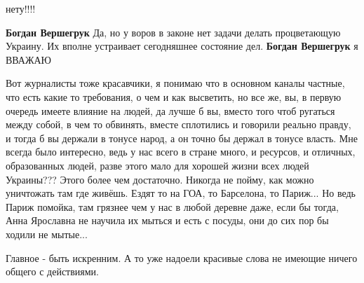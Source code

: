 \begin{itemize}
нету!!!!
\begin{itemize}
\textbf{Богдан Вершегрук} Да, но у воров в законе нет задачи делать процветающую Украину. Их вполне устраивает сегодняшнее состояние дел.
\textbf{Богдан Вершегрук} я ВВАЖАЮ
\end{itemize}

Вот журналисты тоже красавчики, я понимаю что в основном каналы частные, что
есть какие то требования, о чем и как высветить, но все же, вы, в первую
очередь имеете влияние на людей, да лучше б вы, вместо того чтоб ругаться между
собой, в чем то обвинять, вместе сплотились и говорили реально правду, и тогда
б вы держали в тонусе народ, а он точно бы держал в тонусе власть. Мне всегда
было интересно, ведь у нас всего в стране много, и ресурсов, и отличных,
образованных людей, разве этого мало для хорошей жизни всех людей Украины???
Этого более чем достаточно. Никогда не пойму, как можно уничтожать там где
живёшь. Ездят то на ГОА, то Барселона, то Париж... Но ведь Париж помойка, там
грязнее чем у нас в любой деревне даже, если бы тогда, Анна Ярославна не
научила их мыться и есть с посуды, они до сих пор бы ходили не мытые...

Главное - быть искренним. А то уже надоели красивые слова не имеющие ничего общего с действиями.


\end{itemize}

